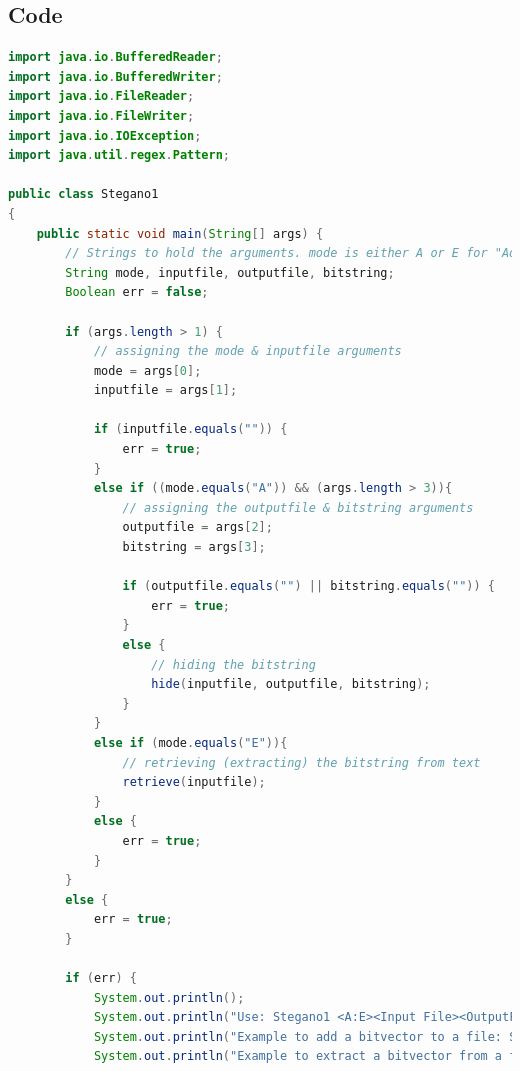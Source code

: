 \documentclass[a4paper]{article}
\begin{document}
\subsection{Code}
\begin{lstlisting}[language=java]
import java.io.BufferedReader;
import java.io.BufferedWriter;
import java.io.FileReader;
import java.io.FileWriter;
import java.io.IOException;
import java.util.regex.Pattern;

public class Stegano1
{
    public static void main(String[] args) {
        // Strings to hold the arguments. mode is either A or E for "Add" or "Extract". 
        String mode, inputfile, outputfile, bitstring;  
        Boolean err = false;                                                    // Boolean to tell if the arguments were passed correctly or not 

        if (args.length > 1) {                                                  // checking that at least one argument was passed to main
            // assigning the mode & inputfile arguments
            mode = args[0];
            inputfile = args[1];
                
            if (inputfile.equals("")) {                                         // checking that an inputfile was provided (String was not empty)
                err = true;
            }
            else if ((mode.equals("A")) && (args.length > 3)){                  // checking if the mode is "Add" & that the number of arguments provided was greater than 3
                // assigning the outputfile & bitstring arguments
                outputfile = args[2];
                bitstring = args[3];
        
                if (outputfile.equals("") || bitstring.equals("")) {            // checking that neither the outputfile nor bitstring were empty strings
                    err = true;
                }
                else {
                    // hiding the bitstring
                    hide(inputfile, outputfile, bitstring);
                }
            }
            else if (mode.equals("E")){                                         // checking if the mode is "Extract"
                // retrieving (extracting) the bitstring from text   
                retrieve(inputfile);   
            }
            else {
                err = true;
            }
        }
        else {
            err = true;
        }
        
        if (err) {
            System.out.println();
            System.out.println("Use: Stegano1 <A:E><Input File><OutputFile><Bitstring>");
            System.out.println("Example to add a bitvector to a file: Stegano1 A inp.txt out.txt 0010101");
            System.out.println("Example to extract a bitvector from a file: Stegano1 E inp.txt");
            

\end{lstlisting}
\end{document}
